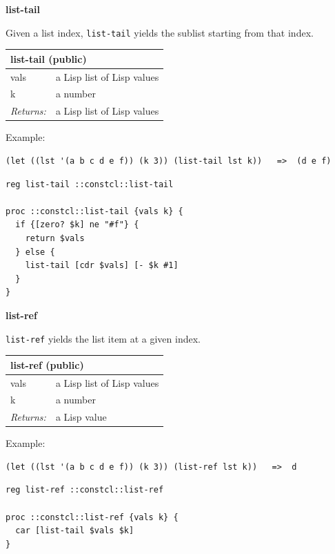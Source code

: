 \documentclass[twoside,9pt]{report}
\begin{document}
\textbf{list-tail}


Given a list index, \texttt{list-tail} yields the sublist starting from that index.

\begin{tabular}{ |l l| }
\hline
\multicolumn{2}{|l|}{list-tail (public)} \\
\hline
vals & a Lisp list of Lisp values \\
k & a number \\
\textit{Returns:} & a Lisp list of Lisp values \\
\hline
\end{tabular}


Example:

\noindent\makebox[\linewidth]{\rule{\linewidth}{0.4pt}}
\begin{lstlisting}
(let ((lst '(a b c d e f)) (k 3)) (list-tail lst k))   =>  (d e f)
\end{lstlisting}
\noindent\makebox[\linewidth]{\rule{\linewidth}{0.4pt}}
\noindent\makebox[\linewidth]{\rule{\linewidth}{0.4pt}}
\begin{lstlisting}
reg list-tail ::constcl::list-tail
 
proc ::constcl::list-tail {vals k} {
  if {[zero? $k] ne "#f"} {
    return $vals
  } else {
    list-tail [cdr $vals] [- $k #1]
  }
}
\end{lstlisting}
\noindent\makebox[\linewidth]{\rule{\linewidth}{0.4pt}}

\textbf{list-ref}


\texttt{list-ref} yields the list item at a given index.

\begin{tabular}{ |l l| }
\hline
\multicolumn{2}{|l|}{list-ref (public)} \\
\hline
vals & a Lisp list of Lisp values \\
k & a number \\
\textit{Returns:} & a Lisp value \\
\hline
\end{tabular}


Example:

\noindent\makebox[\linewidth]{\rule{\linewidth}{0.4pt}}
\begin{lstlisting}
(let ((lst '(a b c d e f)) (k 3)) (list-ref lst k))   =>  d
\end{lstlisting}
\noindent\makebox[\linewidth]{\rule{\linewidth}{0.4pt}}
\noindent\makebox[\linewidth]{\rule{\linewidth}{0.4pt}}
\begin{lstlisting}
reg list-ref ::constcl::list-ref
 
proc ::constcl::list-ref {vals k} {
  car [list-tail $vals $k]
}
\end{lstlisting}
\noindent\makebox[\linewidth]{\rule{\linewidth}{0.4pt}}
\end{document}
